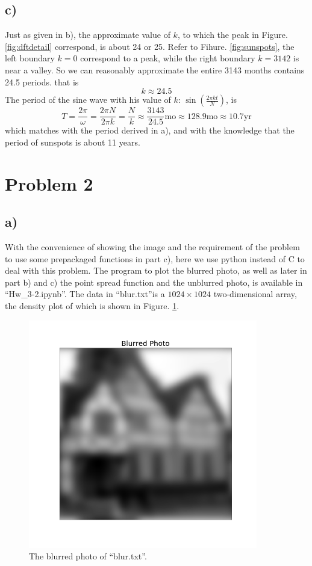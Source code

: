 \documentclass[12pt, graphicx]{article}
\begin{document}
\subsection*{c)}
Just as given in b), the approximate value of $k$, to which the peak in Figure. \ref{fig:dftdetail} correspond, is about 24 or 25. Refer to Fihure. \ref{fig:sunspots}, the left boundary $k=0$ correspond to a peak, while the right boundary $k=3142$ is near a valley. So we can reasonably approximate the entire 3143 months contains 24.5 periods. that is 
\begin{equation}
k\approx24.5
\end{equation}
The period of the sine wave with his value of $k$: $\sin\left(\frac{2\pi kt}{N}\right)$, is
\begin{equation}
T=\frac{2\pi}{\omega}=\frac{2\pi N}{2\pi k}=\frac{N}{k}\approx\frac{3143}{24.5}\mathrm{mo}\approx128.9\mathrm{mo}\approx10.7\mathrm{yr}
\end{equation}
which matches with the period derived in a), and with the knowledge that the period of sunspots is about 11 years. 

\section*{Problem 2}
\subsection*{a)}
With the convenience of showing the image and the requirement of the problem to use some prepackaged functions in part c), here we use python instead of C to deal with this problem. The program to plot the blurred photo, as well as later in part b) and c) the point spread function and the unblurred photo, is available in \textquotedblleft Hw\_3-2.ipynb\textquotedblright. The data in \textquotedblleft blur.txt\textquotedblright is a $1024\times1024$ two-dimensional array, the density plot of which is shown in Figure. \ref{fig:blur}. 

\begin{figure}[ht]
\centering
\includegraphics[width = 100mm]{blurred.png}
\caption{The blurred photo of \textquotedblleft blur.txt\textquotedblright.}
\label{fig:blur}
\end{figure}
\end{document}

